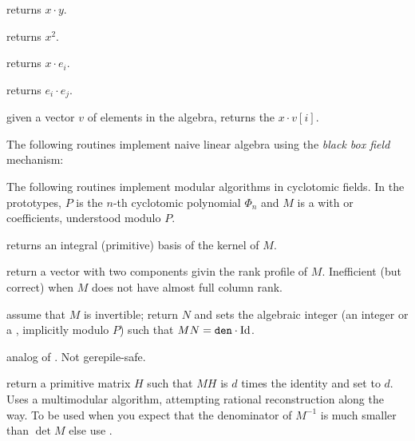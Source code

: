  returns $x\cdot y$.

 returns $x^2$.

 returns $x\cdot e_i$.

 returns $e_i\cdot e_j$.

 given a vector $v$ of elements
in the algebra, returns the $x\cdot v[i]$.

The following routines implement naive linear algebra using the \emph{black box
field} mechanism:







The following routines implement modular algorithms in cyclotomic fields. In
the prototypes, $P$ is the $n$-th cyclotomic polynomial $\Phi_n$ and $M$ is a
 with  or  coefficients, understood modulo $P$.

 returns an integral (primitive)
basis of the kernel of $M$.

 return a vector with two
  components givin the rank profile of $M$. Inefficient
(but correct) when $M$ does not have almost full column rank.

assume that $M$ is invertible; return $N$ and sets the algebraic integer
 (an integer or a , implicitly modulo $P$)
such that $M N = {\tt den} \cdot {\rm Id}$.

 analog
of . Not gerepile-safe.

return a primitive matrix $H$ such that $M H$ is $d$ times the identity
and set  to $d$. Uses a multimodular algorithm, attempting
rational reconstruction along the way. To be used when you expect that the
denominator of $M^{-1}$ is much smaller than $\det M$ else use .

